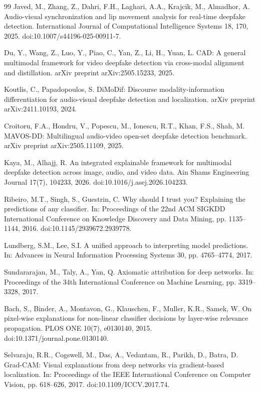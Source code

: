 \documentclass[preprint,12pt,number]{elsarticle}
\begin{document}
\begin{thebibliography}{99}
Javed, M., Zhang, Z., Dahri, F.H., Laghari, A.A., Krajcik, M., Almadhor, A. Audio-visual synchronization and lip movement analysis for real-time deepfake detection. International Journal of Computational Intelligence Systems 18, 170, 2025. doi:10.1007/s44196-025-00911-7.

Du, Y., Wang, Z., Luo, Y., Piao, C., Yan, Z., Li, H., Yuan, L. CAD: A general multimodal framework for video deepfake detection via cross-modal alignment and distillation. arXiv preprint arXiv:2505.15233, 2025.

Koutlis, C., Papadopoulos, S. DiMoDif: Discourse modality-information differentiation for audio-visual deepfake detection and localization. arXiv preprint arXiv:2411.10193, 2024.

Croitoru, F.A., Hondru, V., Popescu, M., Ionescu, R.T., Khan, F.S., Shah, M. MAVOS-DD: Multilingual audio-video open-set deepfake detection benchmark. arXiv preprint arXiv:2505.11109, 2025.

Kaya, M., Alhajj, R. An integrated explainable framework for multimodal deepfake detection across image, audio, and video data. Ain Shams Engineering Journal 17(7), 104233, 2026. doi:10.1016/j.asej.2026.104233.

Ribeiro, M.T., Singh, S., Guestrin, C. Why should I trust you? Explaining the predictions of any classifier. In: Proceedings of the 22nd ACM SIGKDD International Conference on Knowledge Discovery and Data Mining, pp. 1135--1144, 2016. doi:10.1145/2939672.2939778.

Lundberg, S.M., Lee, S.I. A unified approach to interpreting model predictions. In: Advances in Neural Information Processing Systems 30, pp. 4765--4774, 2017.

Sundararajan, M., Taly, A., Yan, Q. Axiomatic attribution for deep networks. In: Proceedings of the 34th International Conference on Machine Learning, pp. 3319--3328, 2017.

Bach, S., Binder, A., Montavon, G., Klauschen, F., Muller, K.R., Samek, W. On pixel-wise explanations for non-linear classifier decisions by layer-wise relevance propagation. PLOS ONE 10(7), e0130140, 2015. doi:10.1371/journal.pone.0130140.

Selvaraju, R.R., Cogswell, M., Das, A., Vedantam, R., Parikh, D., Batra, D. Grad-CAM: Visual explanations from deep networks via gradient-based localization. In: Proceedings of the IEEE International Conference on Computer Vision, pp. 618--626, 2017. doi:10.1109/ICCV.2017.74.


\end{thebibliography}
\end{document}
